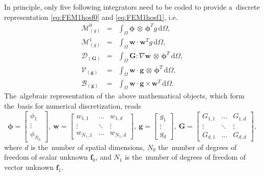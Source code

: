 \documentclass[review]{elsarticle}
\newcommand{\vect}[1]{\boldsymbol{#1}}
\newcommand{\matr}[1]{\mathbf{#1}}
\newcommand{\dI}{\text{d}}
\newcommand{\vfzero}{\vect{f}_0}
\newcommand{\fone}{\vect{f}_1}
\newcommand{\intO}{\int_{\Omega}}
\newcommand{\IM}{\boldsymbol{\mathcal{M}}}
\newcommand{\ID}{\boldsymbol{\mathcal{D}}}
\newcommand{\IV}{\boldsymbol{\mathcal{V}}}
\newcommand{\IB}{\boldsymbol{\mathcal{B}}}
\begin{document}
In principle, only five following integrators need to be coded to provide
a~discrete representation \eqref{eq:FEM1hosf0} and \eqref{eq:FEM1hosf1}, i.e.
\begin{eqnarray}
  \IM^0_{(g)} &=& \intO\vect{\phi}\, \otimes\, \vect{\phi}^T g\, \dI \Omega ,
  \label{eq:IM0}\\
  \IM^1_{(g)} &=& \intO\matr{w} \cdot \matr{w}^T g\, \dI\Omega ,
  \label{eq:IM1}\\
  \ID_{(\matr{G})} &=& \intO \matr{G} : \nabla\matr{w}
  \, \otimes\, \vect{\phi}^T\, \dI \Omega ,
  \label{eq:ID}\\
  \IV_{(\vect{g})} &=& \intO\matr{w} \cdot
  \vect{g}\, \otimes\, \vect{\phi}^T\, \dI \Omega ,
  \label{eq:IV}\\
  \IB_{(\vect{g})} &=& \intO\matr{w} \cdot
  \vect{g} \times \matr{w}^T\, \dI \Omega .
  \label{eq:IB}
\end{eqnarray}
The~algebraic representation of the~above mathematical objects, which
form the~basis for numerical discretization, reads 
\begin{equation}
  \vect{\phi} = \begin{bmatrix}
    \phi_{1} \\
	\vdots   \\
	\phi_{N_0}
  \end{bmatrix},~
  \matr{w} = \begin{bmatrix}
    w_{1, 1} & \hdots & w_{1, d} \\
	\vdots   & \ddots & \vdots \\
	w_{N_1, 1} & \hdots & w_{N_1, d}
  \end{bmatrix},~
  \vect{g} = \begin{bmatrix}
    g_{1} \\
	\vdots   \\
	g_{d}
  \end{bmatrix},~
  \matr{G} = \begin{bmatrix}
    G_{1, 1} & \hdots & G_{1, d} \\
	\vdots   & \ddots & \vdots \\
	G_{d, 1} & \hdots & G_{d, d}
  \end{bmatrix},
\end{equation}
where $d$ is the~number of spatial dimensions, $N_0$ the~number of
degrees of freedom of scalar unknown $\vfzero$, and $N_1$ is the~number
of degrees of freedom of vector unknown $\fone$.
\end{document}
